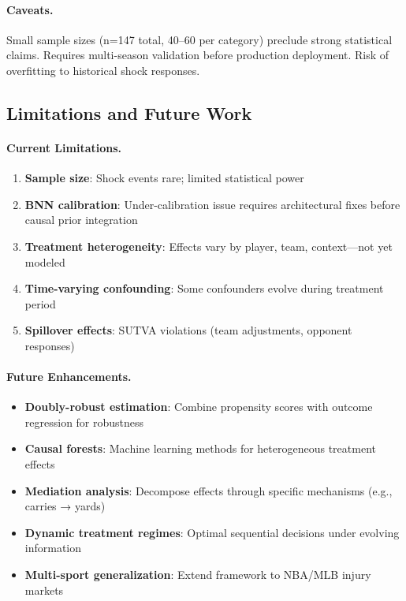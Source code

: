 \paragraph{Caveats.}
Small sample sizes (n=147 total, 40--60 per category) preclude strong statistical claims. Requires multi-season validation before production deployment. Risk of overfitting to historical shock responses.

\subsection{Limitations and Future Work}

\paragraph{Current Limitations.}
\begin{enumerate}
  \item \textbf{Sample size}: Shock events rare; limited statistical power
  \item \textbf{BNN calibration}: Under-calibration issue requires architectural fixes before causal prior integration
  \item \textbf{Treatment heterogeneity}: Effects vary by player, team, context—not yet modeled
  \item \textbf{Time-varying confounding}: Some confounders evolve during treatment period
  \item \textbf{Spillover effects}: SUTVA violations (team adjustments, opponent responses)
\end{enumerate}

\paragraph{Future Enhancements.}
\begin{itemize}
  \item \textbf{Doubly-robust estimation}: Combine propensity scores with outcome regression for robustness
  \item \textbf{Causal forests}: Machine learning methods for heterogeneous treatment effects
  \item \textbf{Mediation analysis}: Decompose effects through specific mechanisms (e.g., carries → yards)
  \item \textbf{Dynamic treatment regimes}: Optimal sequential decisions under evolving information
  \item \textbf{Multi-sport generalization}: Extend framework to NBA/MLB injury markets
\end{itemize}

